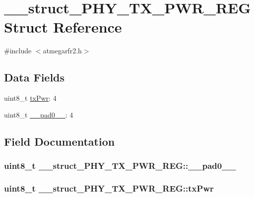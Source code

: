 \hypertarget{struct____struct___p_h_y___t_x___p_w_r___r_e_g}{\section{\-\_\-\-\_\-struct\-\_\-\-P\-H\-Y\-\_\-\-T\-X\-\_\-\-P\-W\-R\-\_\-\-R\-E\-G Struct Reference}
\label{struct____struct___p_h_y___t_x___p_w_r___r_e_g}
}


{\ttfamily \#include $<$atmegarfr2.\-h$>$}

\subsection*{Data Fields}
\begin{DoxyCompactItemize}
\item 
uint8\-\_\-t \hyperlink{struct____struct___p_h_y___t_x___p_w_r___r_e_g_aa204f5e1e56ccd8530a954bcddd6d2c9}{tx\-Pwr}\-: 4
\item 
uint8\-\_\-t \hyperlink{struct____struct___p_h_y___t_x___p_w_r___r_e_g_a705bd62d1038f6f57d237d2751b1215d}{\-\_\-\-\_\-pad0\-\_\-\-\_\-}\-: 4
\end{DoxyCompactItemize}


\subsection{Field Documentation}
\hypertarget{struct____struct___p_h_y___t_x___p_w_r___r_e_g_a705bd62d1038f6f57d237d2751b1215d}{
\subsubsection[{\-\_\-\-\_\-pad0\-\_\-\-\_\-}]{\setlength{\rightskip}{0pt plus 5cm}uint8\-\_\-t \-\_\-\-\_\-struct\-\_\-\-P\-H\-Y\-\_\-\-T\-X\-\_\-\-P\-W\-R\-\_\-\-R\-E\-G\-::\-\_\-\-\_\-pad0\-\_\-\-\_\-}}\label{struct____struct___p_h_y___t_x___p_w_r___r_e_g_a705bd62d1038f6f57d237d2751b1215d}
\hypertarget{struct____struct___p_h_y___t_x___p_w_r___r_e_g_aa204f5e1e56ccd8530a954bcddd6d2c9}{
\subsubsection[{tx\-Pwr}]{\setlength{\rightskip}{0pt plus 5cm}uint8\-\_\-t \-\_\-\-\_\-struct\-\_\-\-P\-H\-Y\-\_\-\-T\-X\-\_\-\-P\-W\-R\-\_\-\-R\-E\-G\-::tx\-Pwr}}\label{struct____struct___p_h_y___t_x___p_w_r___r_e_g_aa204f5e1e56ccd8530a954bcddd6d2c9}


